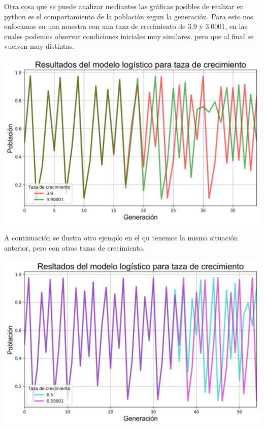 \documentclass[11pt]{article}
\begin{document}
\vspace{1.5cm}

Otra cosa que se puede analizar mediantes las gráficas posibles de realizar en python es el comportamiento de la población segun la generación. Para esto nos enfocamos en una muestra con una taza de crecimiento de 3.9 y 3.0001, en las cuales podemos observar condiciones iniciales muy similares, pero que al final se vuelven muy distintas.\\ 

\vspace{0.5cm}

\begin{center}
\includegraphics[scale=0.60]{logistic-map-parameter-sensitivity.png}
\end{center}

\vspace{1cm}

A continuación se ilustra otro ejemplo en el qu tenemos la misma situación anterior, pero con otras tazas de crecimiento.\\

\vspace{0.2cm}

\begin{center}
\includegraphics[scale=0.60]{logistic-map-initial-conditions.png}
\end{center}
\end{document}
